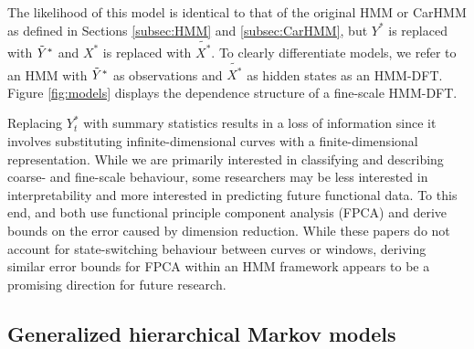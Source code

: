 The likelihood of this model is identical to that of the original HMM or CarHMM as defined in Sections \ref{subsec:HMM} and \ref{subsec:CarHMM}, but $Y^*$ is replaced with $\tilde{Y}^*$ and $X^*$ is replaced with $\tilde{X^*}$. To clearly differentiate models, we refer to an HMM with $\tilde{Y}^*$ as observations and $\tilde{X^*}$ as hidden states as an HMM-DFT. Figure \ref{fig:models} displays the dependence structure of a fine-scale HMM-DFT.

Replacing $Y^*_t$ with summary statistics results in a loss of information since it involves substituting infinite-dimensional curves with a finite-dimensional representation. While we are primarily interested in classifying and describing coarse- and fine-scale behaviour, some researchers may be less interested in interpretability and more interested in predicting future functional data. To this end, \citet{Aue:2015} and \citet{Gao:2019} both use functional principle component analysis (FPCA) and derive bounds on the error caused by dimension reduction. While these papers do not account for state-switching behaviour between curves or windows, deriving similar error bounds for FPCA within an HMM framework appears to be a promising direction for future research. 

\subsection{Generalized hierarchical Markov models}


